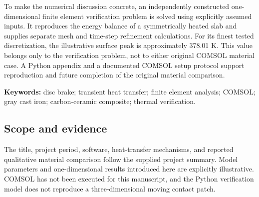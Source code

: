 \documentclass[11pt,a4paper]{article}
\begin{document}
To make the numerical discussion concrete, an independently constructed one-dimensional finite element verification problem is solved using explicitly assumed inputs. It reproduces the energy balance of a symmetrically heated slab and supplies separate mesh and time-step refinement calculations. For its finest tested discretization, the illustrative surface peak is approximately 378.01 K. This value belongs only to the verification problem, not to either original COMSOL material case. A Python appendix and a documented COMSOL setup protocol support reproduction and future completion of the original material comparison.

\textbf{Keywords:} disc brake; transient heat transfer; finite element analysis; COMSOL; gray cast iron; carbon-ceramic composite; thermal verification.

\subsection*{Scope and evidence}
The title, project period, software, heat-transfer mechanisms, and reported qualitative material comparison follow the supplied project summary. Model parameters and one-dimensional results introduced here are explicitly illustrative. COMSOL has not been executed for this manuscript, and the Python verification model does not reproduce a three-dimensional moving contact patch.

\clearpage\begingroup\small\tableofcontents\endgroup
\end{document}
